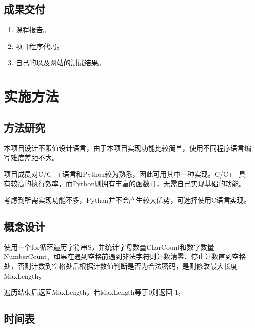 \begin{spacing}{1.5}
    \subsection{成果交付}
    \begin{enumerate} [\indent 1、]
        \item 课程报告。
        \item 项目程序代码。
        \item 自己的以及网站的测试结果。
    \end{enumerate}
    \section{实施方法}
    \subsection{方法研究}
    本项目设计不限值设计语言，由于本项目实现功能比较简单，使用不同程序语言编写难度差距不大。

    项目成员对C/C++语言和Python较为熟悉，因此可用其中一种实现。C/C++具有较高的执行效率，而Python则拥有丰富的函数可，无需自己实现基础的功能。

    考虑到所需实现功能不多，Python并不会产生较大优势，可选择使用C语言实现。

    \subsection{概念设计}
    使用一个for循环遍历字符串S，并统计字母数量CharCount和数字数量NumberCount，如果在遇到空格前遇到非法字符则计数清零、停止计数直到空格处，否则计数到空格处后根据计数值判断是否为合法密码，是则修改最大长度MaxLength。

    遍历结束后返回MaxLength，若MaxLength等于0则返回-1。

    \subsection{时间表}

\end{spacing}

